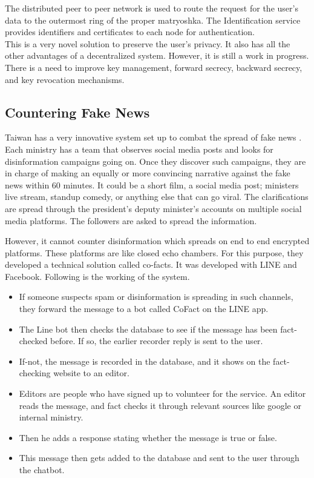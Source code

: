 \documentclass[12pt, conference, a4paper]{article}
\begin{document}
The distributed peer to peer network is used to route the request for the user's data to the outermost ring of the proper matryoshka.
The Identification service provides identifiers and certificates to each node for authentication.\\
This is a very novel solution to preserve the user's privacy. It also has all the other advantages of a decentralized system. However, it is still a work in progress. There is a need to improve key management, forward secrecy, backward secrecy, and key revocation mechanisms.

\subsection{Countering Fake News}
Taiwan has a very innovative system set up to combat the spread of fake news \cite{co-facts}. Each ministry has a team that observes social media posts and looks for disinformation campaigns going on. Once they discover such campaigns, they are in charge of making an equally or more convincing narrative against the fake news within 60 minutes. It could be a short film, a social media post; ministers live stream, standup comedy, or anything else that can go viral. The clarifications are spread through the president's deputy minister's accounts on multiple social media platforms. The followers are asked to spread the information.
\par
However, it cannot counter disinformation which spreads on end to end encrypted platforms. These platforms are like closed echo chambers. For this purpose, they developed a technical solution called co-facts. It was developed with LINE and Facebook. Following is the working of the system.
\begin{itemize}
\item If someone suspects spam or disinformation is spreading in such channels, they forward the message to a bot called CoFact on the LINE app.
\item The Line bot then checks the database to see if the message has been fact-checked before. If so, the earlier recorder reply is sent to the user.
\item If-not, the message is recorded in the database, and it shows on the fact-checking website to an editor.
\item Editors are people who have signed up to volunteer for the service. An editor reads the message, and fact checks it through relevant sources like google or internal ministry.
\item Then he adds a response stating whether the message is true or false.
\item This message then gets added to the database and sent to the user through the chatbot.
\end{itemize}
\end{document}
